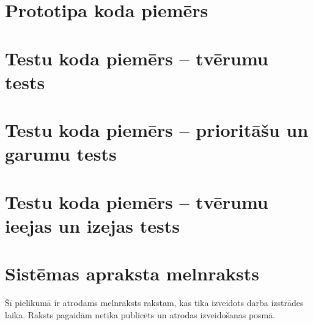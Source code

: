 \documentclass[12pt, a4paper]{article}
\begin{document}
\begin{appendices}

\newcommand{\ap}[1]{\section{#1}}
\renewcommand\thesection{\arabic{section}}

\ap{Prototipa koda piemērs}
\label{ap:code_sample}



\ap{Testu koda piemērs -- tvērumu tests}
\label{ap:test1_sample}



\ap{Testu koda piemērs -- prioritāšu un garumu tests}
\label{ap:test2_sample}



\ap{Testu koda piemērs -- tvērumu ieejas un izejas tests}
\label{ap:test3_sample}



\ap{Sistēmas apraksta melnraksts}
\label{ap:draft}

Šī pielikumā ir atrodams melnraksts rakstam, kas tika izveidots darba izstrādes laika. Raksts pagaidām netika publicēts un atrodas izveidošanas posmā.



\end{appendices}

{}


\reglapa
\end{document}
